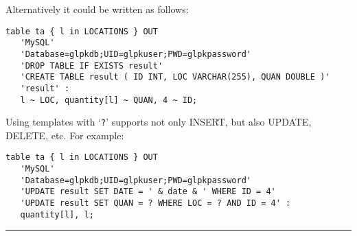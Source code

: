 \documentclass[11pt,draft]{article}
\begin{document}
\noindent
Alternatively it could be written as follows:

\begin{small}
\begin{verbatim}
table ta { l in LOCATIONS } OUT
   'MySQL'
   'Database=glpkdb;UID=glpkuser;PWD=glpkpassword'
   'DROP TABLE IF EXISTS result'
   'CREATE TABLE result ( ID INT, LOC VARCHAR(255), QUAN DOUBLE )'
   'result' :
   l ~ LOC, quantity[l] ~ QUAN, 4 ~ ID;
\end{verbatim}
\end{small}

Using templates with `\verb|?|' supports not only INSERT, but also
UPDATE, DELETE, etc. For example:

\begin{small}
\begin{verbatim}
table ta { l in LOCATIONS } OUT
   'MySQL'
   'Database=glpkdb;UID=glpkuser;PWD=glpkpassword'
   'UPDATE result SET DATE = ' & date & ' WHERE ID = 4'
   'UPDATE result SET QUAN = ? WHERE LOC = ? AND ID = 4' :
   quantity[l], l;
\end{verbatim}
\end{small}

\vspace{15mm}

\begin{center}
\rule{40mm}{.5pt}
\end{center}
\end{document}
